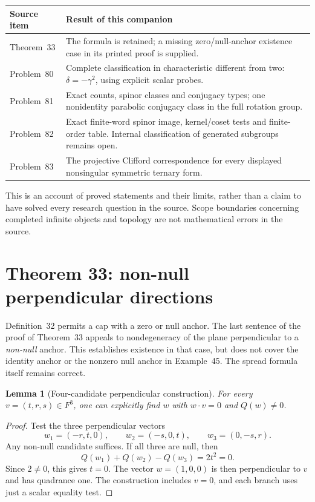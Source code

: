 \documentclass[11pt]{article}
\newtheorem{lemma}[theorem]{Lemma}
\theoremstyle{remark}
\begin{document}
\begin{center}
\begin{tabular}{>{\raggedright\arraybackslash}p{}>{\raggedright\arraybackslash}p{}}
\toprule
Source item & Result of this companion \\
\midrule
Theorem~33 & The formula is retained; a missing zero/null-anchor existence
case in its printed proof is supplied. \\
Problem~80 & Complete classification in characteristic different from two:
\(\delta=-\gamma^2\), using explicit scalar probes. \\
Problem~81 & Exact counts, spinor classes and conjugacy types; one
nonidentity parabolic conjugacy class in the full rotation group. \\
Problem~82 & Exact finite-word spinor image, kernel/coset tests and
finite-order table. Internal classification of generated subgroups remains
open. \\
Problem~83 & The projective Clifford correspondence for every displayed
nonsingular symmetric ternary form. \\
\bottomrule
\end{tabular}
\end{center}

This is an account of proved statements and their limits, rather than a
claim to have solved every research question in the source. Scope boundaries
concerning completed infinite objects and topology are not mathematical
errors in the source.

\section{Theorem 33: non-null perpendicular directions}

Definition~32 permits a cap with a zero or null anchor. The last sentence of
the proof of Theorem~33 appeals to nondegeneracy of the plane perpendicular
to a \emph{non-null} anchor. This establishes existence in that case, but
does not cover the identity anchor or the nonzero null anchor in Example~45.
The spread formula itself remains correct.

\begin{lemma}[Four-candidate perpendicular construction]
For every \(v=(t,r,s)\in F^3\), one can explicitly find \(w\) with
\(w\cdot v=0\) and \(Q(w)\ne0\).
\end{lemma}
\begin{proof}
Test the three perpendicular vectors
\[
 w_1=(-r,t,0),\qquad w_2=(-s,0,t),\qquad w_3=(0,-s,r).
\]
Any non-null candidate suffices. If all three are null, then
\[
 Q(w_1)+Q(w_2)-Q(w_3)=2t^2=0.
\]
Since \(2\ne0\), this gives \(t=0\). The vector \(w=(1,0,0)\) is then
perpendicular to \(v\) and has quadrance one. The construction includes
\(v=0\), and each branch uses just a scalar equality test.
\end{proof}
\end{document}
